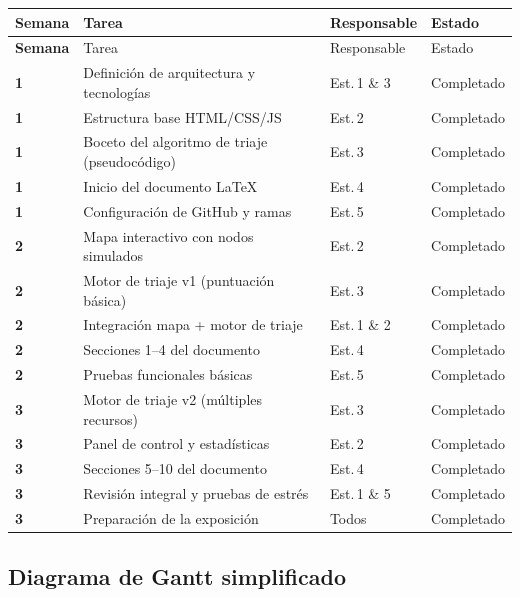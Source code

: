 \documentclass[12pt,a4paper]{article}
\begin{document}
\begin{longtable}{>{\bfseries}p{1.6cm} p{5cm} p{3cm} p{2.2cm}}
  \toprule
  Semana & Tarea & Responsable & Estado \\
  \midrule
  \endfirsthead
  \toprule
  Semana & Tarea & Responsable & Estado \\
  \midrule
  \endhead
  1 & Definición de arquitectura y tecnologías & Est.\,1 \& 3 & \textcolor{green!60!black}{Completado} \\
  1 & Estructura base HTML/CSS/JS & Est.\,2 & \textcolor{green!60!black}{Completado} \\
  1 & Boceto del algoritmo de triaje (pseudocódigo) & Est.\,3 & \textcolor{green!60!black}{Completado} \\
  1 & Inicio del documento \LaTeX & Est.\,4 & \textcolor{green!60!black}{Completado} \\
  1 & Configuración de GitHub y ramas & Est.\,5 & \textcolor{green!60!black}{Completado} \\
  \midrule
  2 & Mapa interactivo con nodos simulados & Est.\,2 & \textcolor{green!60!black}{Completado} \\
  2 & Motor de triaje v1 (puntuación básica) & Est.\,3 & \textcolor{green!60!black}{Completado} \\
  2 & Integración mapa + motor de triaje & Est.\,1 \& 2 & \textcolor{green!60!black}{Completado} \\
  2 & Secciones 1--4 del documento & Est.\,4 & \textcolor{green!60!black}{Completado} \\
  2 & Pruebas funcionales básicas & Est.\,5 & \textcolor{green!60!black}{Completado} \\
  \midrule
  3 & Motor de triaje v2 (múltiples recursos) & Est.\,3 & \textcolor{green!60!black}{Completado} \\
  3 & Panel de control y estadísticas & Est.\,2 & \textcolor{green!60!black}{Completado} \\
  3 & Secciones 5--10 del documento & Est.\,4 & \textcolor{green!60!black}{Completado} \\
  3 & Revisión integral y pruebas de estrés & Est.\,1 \& 5 & \textcolor{green!60!black}{Completado} \\
  3 & Preparación de la exposición & Todos & \textcolor{green!60!black}{Completado} \\
  \bottomrule
\end{longtable}

\subsection{Diagrama de Gantt simplificado}
\end{document}
